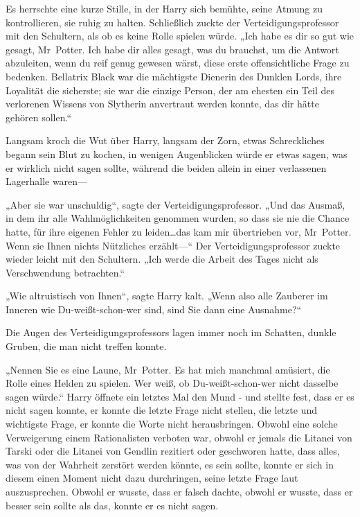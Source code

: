 {Es herrschte eine kurze Stille, in der Harry sich bemühte, seine Atmung zu kontrollieren, sie ruhig zu halten. Schließlich zuckte der Verteidigungsprofessor mit den Schultern, als ob es keine Rolle spielen würde. „Ich habe es dir so gut wie gesagt, Mr~Potter. Ich habe dir alles gesagt, was du brauchst, um die Antwort abzuleiten, wenn du reif genug gewesen wärst, diese erste offensichtliche Frage zu bedenken. Bellatrix Black war die mächtigste Dienerin des Dunklen Lords, ihre Loyalität die sicherste; sie war die einzige Person, der am ehesten ein Teil des verlorenen Wissens von Slytherin anvertraut werden konnte, das dir hätte gehören sollen.“

Langsam kroch die Wut über Harry, langsam der Zorn, etwas Schreckliches begann sein Blut zu kochen, in wenigen Augenblicken würde er etwas sagen, was er wirklich nicht sagen sollte, während die beiden allein in einer verlassenen Lagerhalle waren—

„Aber sie war unschuldig“, sagte der Verteidigungsprofessor. „Und das Ausmaß, in dem ihr alle Wahlmöglichkeiten genommen wurden, so dass sie nie die Chance hatte, für ihre eigenen Fehler zu leiden…das kam mir übertrieben vor, Mr~Potter. Wenn sie Ihnen nichts Nützliches erzählt—“ Der Verteidigungsprofessor zuckte wieder leicht mit den Schultern. „Ich werde die Arbeit des Tages nicht als Verschwendung betrachten.“

„Wie altruistisch von Ihnen“, sagte Harry kalt. „Wenn also alle Zauberer im Inneren wie Du-weißt-schon-wer sind, sind Sie dann eine Ausnahme?“

Die Augen des Verteidigungsprofessors lagen immer noch im Schatten, dunkle Gruben, die man nicht treffen konnte.

„Nennen Sie es eine Laune, Mr~Potter. Es hat mich manchmal amüsiert, die Rolle eines Helden zu spielen. Wer weiß, ob Du-weißt-schon-wer nicht dasselbe sagen würde.“ Harry öffnete ein letztes Mal den Mund - und stellte fest, dass er es nicht sagen konnte, er konnte die letzte Frage nicht stellen, die letzte und wichtigste Frage, er konnte die Worte nicht herausbringen. Obwohl eine solche Verweigerung einem Rationalisten verboten war, obwohl er jemals die Litanei von Tarski oder die Litanei von Gendlin rezitiert oder geschworen hatte, dass alles, was von der Wahrheit zerstört werden könnte, es sein sollte, konnte er sich in diesem einen Moment nicht dazu durchringen, seine letzte Frage laut auszusprechen. Obwohl er wusste, dass er falsch dachte, obwohl er wusste, dass er besser sein sollte als das, konnte er es nicht sagen.

}
